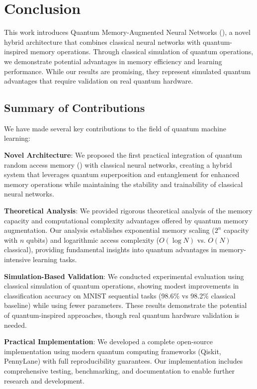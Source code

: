 \section{Conclusion}
\label{sec:conclusion}

This work introduces Quantum Memory-Augmented Neural Networks (\qmnn), a novel hybrid architecture that combines classical neural networks with quantum-inspired memory operations. Through classical simulation of quantum operations, we demonstrate potential advantages in memory efficiency and learning performance. While our results are promising, they represent simulated quantum advantages that require validation on real quantum hardware.

\subsection{Summary of Contributions}

We have made several key contributions to the field of quantum machine learning:

\textbf{Novel Architecture}: We proposed the first practical integration of quantum random access memory (\qram) with classical neural networks, creating a hybrid system that leverages quantum superposition and entanglement for enhanced memory operations while maintaining the stability and trainability of classical neural networks.

\textbf{Theoretical Analysis}: We provided rigorous theoretical analysis of the memory capacity and computational complexity advantages offered by quantum memory augmentation. Our analysis establishes exponential memory scaling ($2^n$ capacity with $n$ qubits) and logarithmic access complexity ($O(\log N)$ vs. $O(N)$ classical), providing fundamental insights into quantum advantages in memory-intensive learning tasks.

\textbf{Simulation-Based Validation}: We conducted experimental evaluation using classical simulation of quantum operations, showing modest improvements in classification accuracy on MNIST sequential tasks (98.6\% vs 98.2\% classical baseline) while using fewer parameters. These results demonstrate the potential of quantum-inspired approaches, though real quantum hardware validation is needed.

\textbf{Practical Implementation}: We developed a complete open-source implementation using modern quantum computing frameworks (Qiskit, PennyLane) with full reproducibility guarantees. Our implementation includes comprehensive testing, benchmarking, and documentation to enable further research and development.

